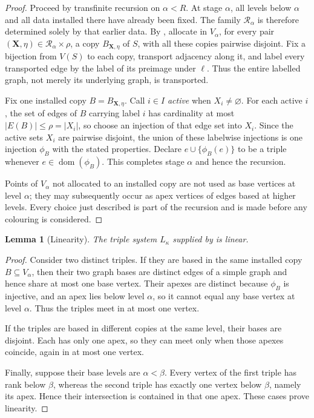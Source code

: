 \documentclass[11pt]{amsart}
\newtheorem{lemma}[lemma]{Lemma}
\theoremstyle{definition}
\theoremstyle{remark}
\numberwithin{equation}{section}
\DeclareMathOperator{\dom}{dom}
\begin{document}
\begin{proof}
Proceed by transfinite recursion on $\alpha<R$.  At stage $\alpha$, all
levels below $\alpha$ and all data installed there have already been
fixed.  The family $\mathcal R_\alpha$ is therefore determined solely by
that earlier data.  By , allocate in
$V_\alpha$, for every pair
$(\mathbf X,\eta)\in\mathcal R_\alpha\times\rho$, a copy
$B_{\mathbf X,\eta}$ of $S$, with all these copies pairwise disjoint.
Fix a bijection from $V(S)$ to each copy, transport adjacency along it,
and label every transported edge by the label of its preimage under
$\ell$.  Thus the entire labelled graph, not merely its underlying graph,
is transported.

Fix one installed copy $B=B_{\mathbf X,\eta}$.  Call $i\in I$
\emph{active} when $X_i\ne\varnothing$.  For each active $i$, the set of
edges of $B$ carrying label $i$ has cardinality at most
$|E(B)|\le\rho=|X_i|$, so choose an injection of that edge set into
$X_i$.  Since the active sets $X_i$ are pairwise disjoint, the union of
these labelwise injections is one injection $\phi_B$ with the stated
properties.  Declare $e\cup\{\phi_B(e)\}$ to be a triple whenever
$e\in\dom(\phi_B)$.  This completes stage $\alpha$ and hence the
recursion.

Points of $V_\alpha$ not allocated to an installed copy are not used as
base vertices at level $\alpha$; they may subsequently occur as apex
vertices of edges based at higher levels.  Every choice just described is
part of the recursion and is made before any colouring is considered.
\end{proof}

\begin{lemma}[Linearity]
\label{lem:calibration-linearity}
The triple system $L_\kappa$ supplied by
 is linear.
\end{lemma}

\begin{proof}
Consider two distinct triples.  If they are based in the same installed
copy $B\subseteq V_\alpha$, then their two graph bases are distinct edges
of a simple graph and hence share at most one base vertex.  Their apexes
are distinct because $\phi_B$ is injective, and an apex lies below level
$\alpha$, so it cannot equal any base vertex at level $\alpha$.  Thus the
triples meet in at most one vertex.

If the triples are based in different copies at the same level, their
bases are disjoint.  Each has only one apex, so they can meet only when
those apexes coincide, again in at most one vertex.

Finally, suppose their base levels are $\alpha<\beta$.  Every vertex of
the first triple has rank below $\beta$, whereas the second triple has
exactly one vertex below $\beta$, namely its apex.  Hence their
intersection is contained in that one apex.  These cases prove
linearity.
\end{proof}
\end{document}
